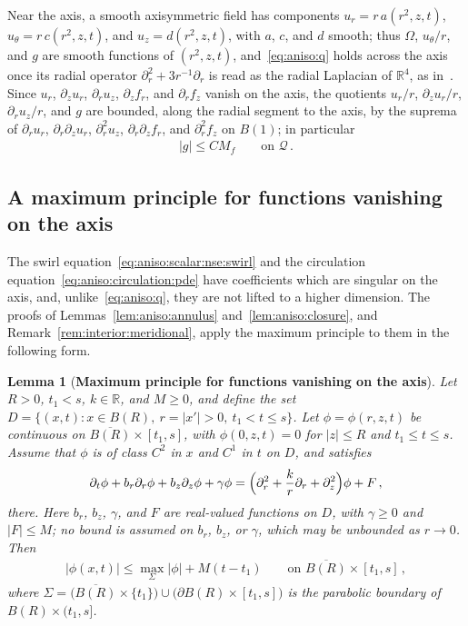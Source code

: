 \documentclass[11pt,reqno]{amsproc}
\numberwithin{equation}{section}
\newtheorem{lemma}[theorem]{Lemma}
\theoremstyle{remark}
\newcommand{\p}{\partial}
\newcommand{\RR}{\mathbb R}
\begin{document}
Near the axis, a smooth axisymmetric field has components $u_r=r\,a(r^2,z,t)$, $u_\theta=r\,c(r^2,z,t)$, and $u_z=d(r^2,z,t)$, with $a$, $c$, and $d$ smooth; thus $\Omega$, $u_\theta/r$, and $g$ are smooth functions of $(r^2,z,t)$, and~\eqref{eq:aniso:q} holds across the axis once its radial operator $\p_r^2+3r^{-1}\p_r$ is read as the radial Laplacian of $\RR^4$, as in~\cite{KNSS09}. Since $u_r$, $\p_zu_r$, $\p_ru_z$, $\p_zf_r$, and $\p_rf_z$ vanish on the axis, the quotients $u_r/r$, $\p_zu_r/r$, $\p_ru_z/r$, and $g$ are bounded, along the radial segment to the axis, by the suprema of $\p_ru_r$, $\p_r\p_zu_r$, $\p_r^2u_z$, $\p_r\p_zf_r$, and $\p_r^2f_z$ on $B(1)$; in particular
\begin{align}
|g|\le CM_f
\qquad\mbox{on }\mathcal Q
\,.
\label{eq:interior:force:quotient}
\end{align}


\subsection{A maximum principle for functions vanishing on the axis}
\label{sec:aniso:axis}

The swirl equation~\eqref{eq:aniso:scalar:nse:swirl} and the circulation equation~\eqref{eq:aniso:circulation:pde} have coefficients which are singular on the axis, and, unlike~\eqref{eq:aniso:q}, they are not lifted to a higher dimension. The proofs of Lemmas~\ref{lem:aniso:annulus} and~\ref{lem:aniso:closure}, and Remark~\ref{rem:interior:meridional}, apply the maximum principle to them in the following form.

\begin{lemma}[{\bf Maximum principle for functions vanishing on the axis}]
\label{lem:aniso:axis}
Let $R>0$, $t_1<s$, $k\in\RR$, and $M\ge0$, and define the set $D=\{(x,t)\colon x\in B(R),\ r=|x'|>0,\ t_1<t\le s\}$. Let $\phi=\phi(r,z,t)$ be continuous on $\overline{B(R)}\times[t_1,s]$, with $\phi(0,z,t)=0$ for $|z|\le R$ and $t_1\le t\le s$. Assume that $\phi$ is of class $C^2$ in $x$ and $C^1$ in $t$ on $D$, and satisfies
\begin{align}
\p_t\phi+b_r\p_r\phi+b_z\p_z\phi+\gamma\phi
=\Bigl(\p_r^2+\frac kr\p_r+\p_z^2\Bigr)\phi+F
\,,
\label{eq:aniso:axis:pde}
\end{align}
there. Here $b_r$, $b_z$, $\gamma$, and $F$ are real-valued functions on $D$, with $\gamma\ge0$ and $|F|\le M$; no bound is assumed on $b_r$, $b_z$, or $\gamma$, which may be unbounded as $r\to0$. Then
\begin{align}
|\phi(x,t)|\le\max_{\Sigma}|\phi|+M(t-t_1)
\qquad\mbox{on }\overline{B(R)}\times[t_1,s]
\,,
\label{eq:aniso:axis:bound}
\end{align}
where $\Sigma=\bigl(\overline{B(R)}\times\{t_1\}\bigr)\cup\bigl(\partial B(R)\times[t_1,s]\bigr)$ is the parabolic boundary of $B(R)\times(t_1,s]$.
\end{lemma}
\end{document}
